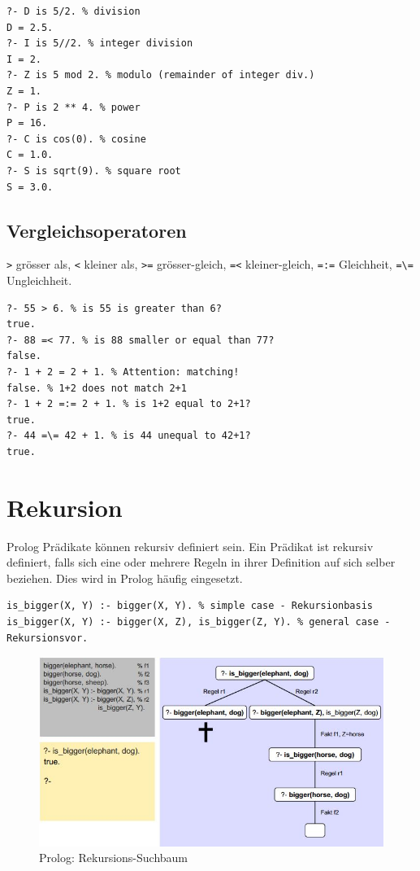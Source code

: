 \begin{lstlisting}[caption=Arithmetische Terme]
?- D is 5/2. % division
D = 2.5.
?- I is 5//2. % integer division
I = 2.
?- Z is 5 mod 2. % modulo (remainder of integer div.)
Z = 1.
?- P is 2 ** 4. % power
P = 16.
?- C is cos(0). % cosine
C = 1.0.
?- S is sqrt(9). % square root
S = 3.0.
\end{lstlisting}

\subsection{Vergleichsoperatoren}
\verb|>| grösser als, \verb|<| kleiner als, \verb|>=| grösser-gleich, \verb|=<| kleiner-gleich, \verb|=:=| Gleichheit, \verb|=\=| Ungleichheit.

\begin{lstlisting}[caption=Terme mit Vergleichen]
?- 55 > 6. % is 55 is greater than 6?
true.
?- 88 =< 77. % is 88 smaller or equal than 77?
false.
?- 1 + 2 = 2 + 1. % Attention: matching!
false. % 1+2 does not match 2+1
?- 1 + 2 =:= 2 + 1. % is 1+2 equal to 2+1?
true.
?- 44 =\= 42 + 1. % is 44 unequal to 42+1?
true.
\end{lstlisting}

\newpage

\section{Rekursion}
Prolog Prädikate können rekursiv definiert sein. Ein Prädikat ist rekursiv definiert, falls sich eine oder mehrere Regeln in ihrer Definition auf sich selber beziehen. Dies wird in Prolog häufig eingesetzt.

\begin{lstlisting}[caption=Beispiel Rekursion]
is_bigger(X, Y) :- bigger(X, Y). % simple case - Rekursionbasis
is_bigger(X, Y) :- bigger(X, Z), is_bigger(Z, Y). % general case - Rekursionsvor.
\end{lstlisting}

\begin{figure}[h!]
\centering
\includegraphics[width=0.7\linewidth]{fig/prolog-suchbaum-rekursion}
\caption{Prolog: Rekursions-Suchbaum}
\label{fig:prolog-suchbaum-rekursion}
\end{figure}

